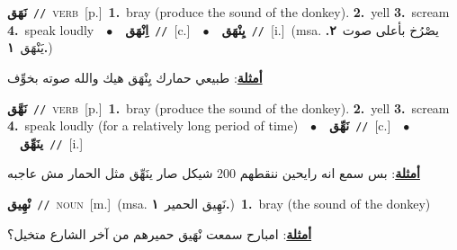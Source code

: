 \documentclass[10pt,a4paper,twoside]{article} %
\begin{document}
\begin{multicols}{2}
{\setlength\topsep{0pt}\textbf{\foreignlanguage{arabic}{نَهَق}}\ {\color{gray}\texttt{//}\color{black}}\ \textsc{verb}\ [p.]\ \textbf{1.}~bray (produce the sound of the donkey).  \textbf{2.}~yell  \textbf{3.}~scream  \textbf{4.}~speak loudly\ \ $\bullet$\ \ \setlength\topsep{0pt}\textbf{\foreignlanguage{arabic}{اِنْهَق}}\ {\color{gray}\texttt{//}\color{black}}\ [c.]\ \ $\bullet$\ \ \setlength\topsep{0pt}\textbf{\foreignlanguage{arabic}{يِنْهَق}}\ {\color{gray}\texttt{//}\color{black}}\ [i.]\ \color{gray}(msa. \foreignlanguage{arabic}{يصْرُخ بأعلى صوت}~\foreignlanguage{arabic}{\textbf{٢.}}  \foreignlanguage{arabic}{يَنْهَق}~\foreignlanguage{arabic}{\textbf{١.}})\color{black}\  \begin{flushright}\color{gray}\foreignlanguage{arabic}{\textbf{\underline{\foreignlanguage{arabic}{أمثلة}}}: طبيعي حمارك يِنْهَق هيك والله صوته بخوِّف}\end{flushright}\color{black}} \vspace{2mm}

{\setlength\topsep{0pt}\textbf{\foreignlanguage{arabic}{نَهَّق}}\ {\color{gray}\texttt{//}\color{black}}\ \textsc{verb}\ [p.]\ \textbf{1.}~bray (produce the sound of the donkey).  \textbf{2.}~yell  \textbf{3.}~scream  \textbf{4.}~speak loudly (for a relatively long period of time)\ \ $\bullet$\ \ \setlength\topsep{0pt}\textbf{\foreignlanguage{arabic}{نَهِّق}}\ {\color{gray}\texttt{//}\color{black}}\ [c.]\ \ $\bullet$\ \ \setlength\topsep{0pt}\textbf{\foreignlanguage{arabic}{ينَهِّق}}\ {\color{gray}\texttt{//}\color{black}}\ [i.]\  \begin{flushright}\color{gray}\foreignlanguage{arabic}{\textbf{\underline{\foreignlanguage{arabic}{أمثلة}}}: بس سمع انه رايحين ننقطهم 200 شيكل صار ينَهِّق مثل الحمار مش عاجبه}\end{flushright}\color{black}} \vspace{2mm}

{\setlength\topsep{0pt}\textbf{\foreignlanguage{arabic}{نْهِيق}}\ {\color{gray}\texttt{//}\color{black}}\ \textsc{noun}\ [m.]\ \color{gray}(msa. \foreignlanguage{arabic}{نَهِيق الحمير}~\foreignlanguage{arabic}{\textbf{١.}})\color{black}\ \textbf{1.}~bray (the sound of the donkey)\  \begin{flushright}\color{gray}\foreignlanguage{arabic}{\textbf{\underline{\foreignlanguage{arabic}{أمثلة}}}: امبارح سمعت نْهَيق حميرهم من آخر الشارع متخيل؟}\end{flushright}\color{black}} \vspace{2mm}


\end{multicols}
\end{document}
